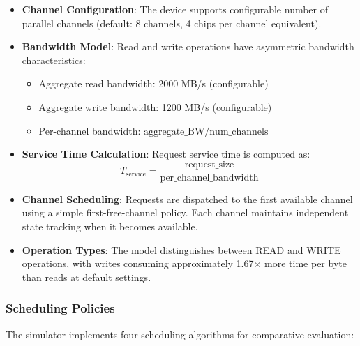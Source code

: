 \documentclass[11pt]{article}
\begin{document}
\begin{itemize}
    \item \textbf{Channel Configuration}: The device supports configurable number of parallel channels (default: 8 channels, 4 chips per channel equivalent).
    \item \textbf{Bandwidth Model}: Read and write operations have asymmetric bandwidth characteristics:
    \begin{itemize}
        \item Aggregate read bandwidth: 2000 MB/s (configurable)
        \item Aggregate write bandwidth: 1200 MB/s (configurable)
        \item Per-channel bandwidth: $\text{aggregate\_BW} / \text{num\_channels}$
    \end{itemize}
    \item \textbf{Service Time Calculation}: Request service time is computed as:
    \begin{equation}
        T_{\text{service}} = \frac{\text{request\_size}}{\text{per\_channel\_bandwidth}}
    \end{equation}
    \item \textbf{Channel Scheduling}: Requests are dispatched to the first available channel using a simple first-free-channel policy. Each channel maintains independent state tracking when it becomes available.
    \item \textbf{Operation Types}: The model distinguishes between READ and WRITE operations, with writes consuming approximately 1.67$\times$ more time per byte than reads at default settings.
\end{itemize}

\subsubsection{Scheduling Policies}

The simulator implements four scheduling algorithms for comparative evaluation:
\end{document}
